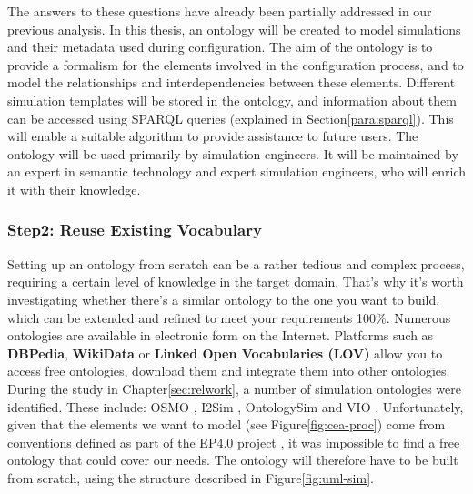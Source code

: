     The answers to these questions have already been partially addressed in our previous analysis. In this thesis, an ontology will be created to model simulations and their metadata used during configuration. The aim of the ontology is to provide a formalism for the elements involved in the configuration process, and to model the relationships and interdependencies between these elements. Different simulation templates will be stored in the ontology, and information about them can be accessed using SPARQL queries (explained in Section\ref{para:sparql}). This will enable a suitable algorithm to provide assistance to future users. The ontology will be used primarily by simulation engineers. It will be maintained by an expert in semantic technology and expert simulation engineers, who will enrich it with their knowledge.

    
    \subsubsection{Step2: Reuse Existing Vocabulary}
    Setting up an ontology from scratch can be a rather tedious and complex process, requiring a certain level of knowledge in the target domain. That's why it's worth investigating whether there's a similar ontology to the one you want to build, which can be extended and refined to meet your requirements 100\%. Numerous ontologies are available in electronic form on the Internet. Platforms such as \textbf{DBPedia}, \textbf{WikiData} or \textbf{Linked Open Vocabularies (LOV)} allow you to access free ontologies, download them and integrate them into other ontologies.\\
    
    During the study in Chapter\ref{sec:relwork}, a number of simulation ontologies were identified. These include: OSMO \cite{horsch2021osmo}, I2Sim \cite{grolinger2012ontology}, OntologySim \cite{may2022ontology} and VIO \cite{spelten2023simulation}. Unfortunately, given that the elements we want to model (see Figure\ref{fig:cea-proc}) come from conventions defined as part of the EP4.0 project \cite{assistSim}, it was impossible to find a free ontology that could cover our needs. The ontology will therefore have to be built from scratch, using the structure described in Figure\ref{fig:uml-sim}.


